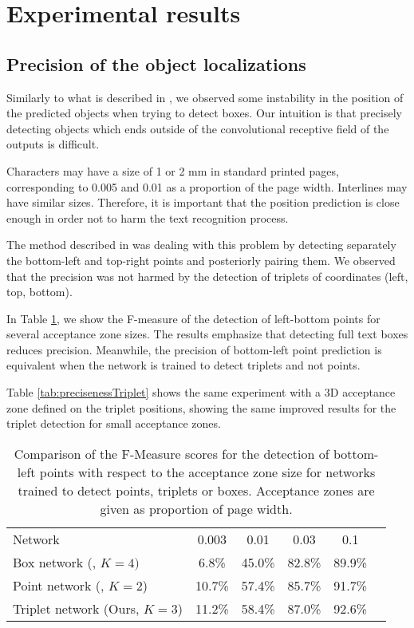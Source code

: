\documentclass[conference]{IEEEtran}
\begin{document}
\section{Experimental results}
\label{sec:results}
\subsection{Precision of the object localizations}
Similarly to what is described in \cite{moysset2016points}, we observed some instability in the position of the predicted objects when trying to detect boxes. Our intuition is that precisely detecting objects which ends outside of the convolutional receptive field of the outputs is difficult. 

Characters may have a size of 1 or 2 mm in standard printed pages, corresponding to 0.005 and 0.01 as a proportion of the page width. Interlines may have similar sizes. Therefore, it is important that the position prediction is close enough in order not to harm the text recognition process.

The method described in \cite{moysset2016points} was dealing with this problem by detecting separately the bottom-left and top-right points and posteriorly pairing them. We observed that the precision was not harmed by the detection of triplets of coordinates (left, top, bottom). 

In Table \ref{tab:precisenessPoint}, we show the F-measure of the detection of left-bottom points for several acceptance zone sizes. The results emphasize that detecting full text boxes reduces precision. Meanwhile, the precision of bottom-left point prediction is equivalent when the network is trained to detect triplets and not points.

Table \ref{tab:precisenessTriplet} shows the same experiment with a 3D acceptance zone defined on the triplet positions, showing the same improved results for the triplet detection for small acceptance zones. 



\begin{table}
\begin{center}
\caption{Comparison of the F-Measure scores for the detection of bottom-left points with respect to the acceptance zone size for networks trained to detect points, triplets or boxes. Acceptance zones are given as proportion of page width.}
\label{tab:precisenessPoint}
\begin{tabular}{lccccc}
Network & 0.003 & 0.01  & 0.03 &  0.1  \\ %
\arrayrulecolor{cwblue1} \toprule
Box network (\cite{moysset2016learning}, $K{=}4)$ & 6.8\% & 45.0\% & 82.8\% & 89.9\% \\ %
Point network (\cite{moysset2016points}, $K{=}2$) & 10.7\% & 57.4\% & 85.7\% & 91.7\% \\ %
Triplet network (Ours, $K{=}3$) & 11.2\% & 58.4\% & 87.0\% & 92.6\% \\ %
\end{tabular}
\end{center}
\end{table}
\end{document}
